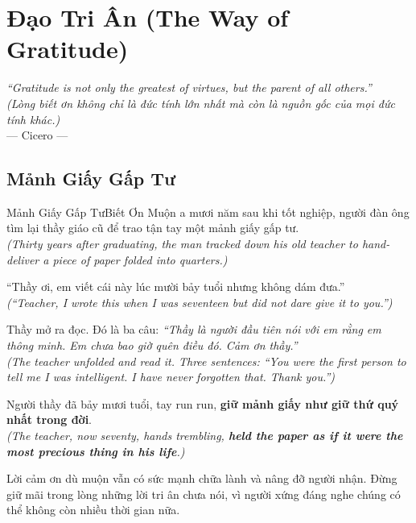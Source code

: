 \chapter{Đạo Tri Ân (The Way of Gratitude)}

\begin{center}
  \textit{\color{truyenblue}``Gratitude is not only the greatest of virtues, but the parent of all others.''}\\
  \textit{(Lòng biết ơn không chỉ là đức tính lớn nhất mà còn là nguồn gốc của mọi đức tính khác.)}\\[4pt]
  \small\color{truyengold}--- Cicero ---
\end{center}
\ngancach

\section{Mảnh Giấy Gấp Tư}
\begin{truyen}{Mảnh Giấy Gấp Tư}{Biết Ơn Muộn}
a mươi năm sau khi tốt nghiệp, người đàn ông tìm lại thầy giáo cũ để trao tận tay một mảnh giấy gấp tư.\\
\textit{(Thirty years after graduating, the man tracked down his old teacher to hand-deliver a piece of paper folded into quarters.)}

``Thầy ơi, em viết cái này lúc mười bảy tuổi nhưng không dám đưa.''\\
\textit{(``Teacher, I wrote this when I was seventeen but did not dare give it to you.'')}

Thầy mở ra đọc. Đó là ba câu: \textit{``Thầy là người đầu tiên nói với em rằng em thông minh. Em chưa bao giờ quên điều đó. Cảm ơn thầy.''}\\
\textit{(The teacher unfolded and read it. Three sentences: \textit{``You were the first person to tell me I was intelligent. I have never forgotten that. Thank you.''})}

Người thầy đã bảy mươi tuổi, tay run run, \textbf{giữ mảnh giấy như giữ thứ quý nhất trong đời}.\\
\textit{(The teacher, now seventy, hands trembling, \textbf{held the paper as if it were the most precious thing in his life}.)}
\end{truyen}
\begin{baihoc}
  Lời cảm ơn dù muộn vẫn có sức mạnh chữa lành và nâng đỡ người nhận. Đừng giữ mãi trong lòng những lời tri ân chưa nói, vì người xứng đáng nghe chúng có thể không còn nhiều thời gian nữa.
\end{baihoc}

